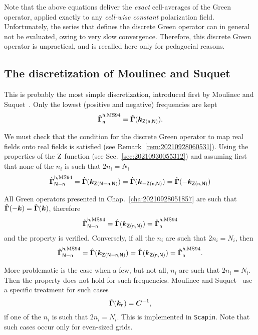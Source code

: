 Note that the above equations deliver the \emph{exact} cell-averages of the
Green operator, applied exactly to any \emph{cell-wise constant} polarization
field. Unfortunately, the series that defines the discrete Green operator can in
general not be evaluated, owing to very slow convergence. Therefore, this
discrete Green operator is unpractical, and is recalled here only for pedagocial
reasons.

\subsection{The discretization of Moulinec and Suquet}

This is probably the most simple discretization, introduced first by Moulinec
and Suquet~\cite{moul1994, moul1998}. Only the lowest (positive and negative)
frequencies are kept
\begin{equation}
  \hat{\boldsymbol\Gamma}_{\mathsf n}^{\mathsf h, \mathrm{MS94}}=\hat{\boldsymbol\Gamma}
  (\boldsymbol k_{\mathsf Z(\mathsf n, \mathsf N)}).
\end{equation}

We must check that the condition for the discrete Green operator to map real
fields onto real fields is satisfied (see
Remark~\ref{rem:20210928060531}). Using the properties of the \(\operatorname{Z}\)
function (see Sec.~\ref{sec:20210930055312}) and assuming first that none of the
\(n_i\) is such that \(2n_i=N_i\)
\begin{equation}
  \hat{\boldsymbol\Gamma}_{\mathsf N-\mathsf n}^{\mathsf h, \mathrm{MS94}}
  =\hat{\boldsymbol\Gamma}(\boldsymbol k_{\mathsf Z(\mathsf N-\mathsf n, \mathsf N)})
  =\hat{\boldsymbol\Gamma}(\boldsymbol k_{-\mathsf Z(\mathsf n, \mathsf N)})
  =\hat{\boldsymbol\Gamma}(-\boldsymbol k_{\mathsf Z(\mathsf n, \mathsf N)})
\end{equation}

All Green operators presented in Chap.~\ref{cha:20210928051857} are such that
\(\hat{\boldsymbol\Gamma}(-\boldsymbol k)=\hat{\boldsymbol\Gamma}(\boldsymbol k)\), therefore
\begin{equation}
  \hat{\boldsymbol\Gamma}_{\mathsf N-\mathsf n}^{\mathsf h, \mathrm{MS94}}
  =\hat{\boldsymbol\Gamma}(\boldsymbol k_{\mathsf Z(\mathsf n, \mathsf N)})
  =\hat{\boldsymbol\Gamma}_{\mathsf n}^{\mathsf h, \mathrm{MS94}}
\end{equation}
and the property is verified. Conversely, if all the \(n_i\) are such that
\(2n_i=N_i\), then
\begin{equation}
  \hat{\boldsymbol\Gamma}_{\mathsf N-\mathsf n}^{\mathsf h, \mathrm{MS94}}
  =\hat{\boldsymbol\Gamma}(\boldsymbol k_{\mathsf Z(\mathsf N-\mathsf n, \mathsf N)})
  =\hat{\boldsymbol\Gamma}(\boldsymbol k_{\mathsf Z(\mathsf n, \mathsf N)})
  =\hat{\boldsymbol\Gamma}_{\mathsf n}^{\mathsf h, \mathrm{MS94}}.
\end{equation}

More problematic is the case when a few, but not all, \(n_i\) are such that
\(2n_i=N_i\). Then the property does not hold for such frequencies. Moulinec and
Suquet~\cite{moul1998} use a specific treatment for such cases
\begin{equation}
  \hat{\boldsymbol\Gamma}(\boldsymbol k_{\mathsf n})=\boldsymbol C^{-1},
\end{equation}
if one of the \(n_i\) is such that \(2n_i=N_i\). This is implemented in
\texttt{Scapin}. Note that such cases occur only for even-sized grids.
